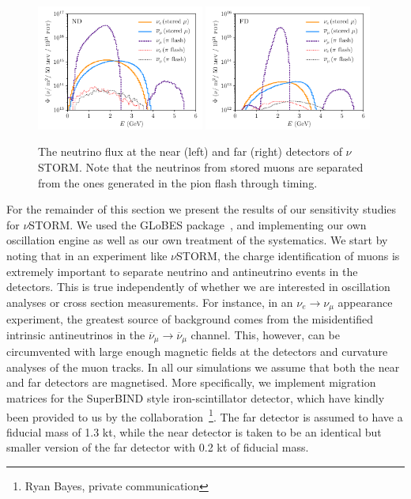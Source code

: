 \begin{figure}[t]
\centering
\includegraphics[width=0.49\textwidth]{figs/flux_ND.pdf}
\includegraphics[width=0.49\textwidth]{figs/flux_FD.pdf}
\caption[The \nus neutrino flux for the near and far detector.]{The neutrino flux at the near (left) and far (right) detectors of $\nu$STORM. Note that the neutrinos from stored muons are separated from the ones generated in the pion flash through timing. \label{fig:nustorm_flux}}
\end{figure}
%

For the remainder of this section we present the results of our sensitivity studies for $\nu$STORM. We used the GLoBES package~\cite{Globes2005}, and implementing our own oscillation engine as well as our own treatment of the systematics. We start by noting that in an experiment like $\nu$STORM, the charge identification of muons is extremely important to separate neutrino and antineutrino events in the detectors. This is true independently of whether we are interested in oscillation analyses or cross section measurements. For instance, in an $\nu_{e} \to \nu_{\mu}$ appearance experiment, the greatest source of background comes from the misidentified intrinsic antineutrinos in the $\overline{\nu}_{\mu} \to \overline{\nu}_{\mu}$ channel. This, however, can be circumvented with large enough magnetic fields at the detectors and curvature analyses of the muon tracks. In all our simulations we assume that both the near and far detectors are magnetised. More specifically, we implement migration matrices for the SuperBIND style iron-scintillator detector, which have kindly been provided to us by the collaboration~\footnote{Ryan Bayes, private communication}. The far detector is assumed to have a fiducial mass of 1.3 kt, while the near detector is taken to be an identical but smaller version of the far detector with 0.2 kt of fiducial mass.

